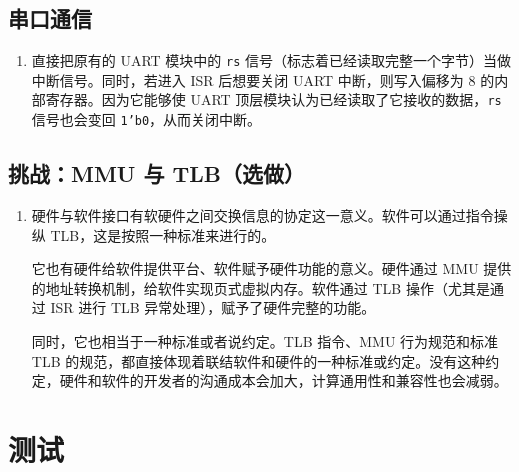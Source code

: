\documentclass[12pt,AutoFakeBold,AutoFakeSlant]{article}
\newcommand{\ms}[1]{\texttt{#1}}
\begin{document}
\subsection{串口通信}

\begin{enumerate}
\item
直接把原有的 UART 模块中的 \ms{rs} 信号（标志着已经读取完整一个字节）当做中断信号。同时，若进入 ISR 后想要关闭 UART 中断，则写入偏移为 8 的内部寄存器。因为它能够使 UART 顶层模块认为已经读取了它接收的数据，\ms{rs} 信号也会变回 \ms{1'b0}，从而关闭中断。
\end{enumerate}

\subsection{挑战：MMU 与 TLB（选做）}

\begin{enumerate}
\item
硬件与软件接口有软硬件之间交换信息的协定这一意义。软件可以通过指令操纵 TLB，这是按照一种标准来进行的。

它也有硬件给软件提供平台、软件赋予硬件功能的意义。硬件通过 MMU 提供的地址转换机制，给软件实现页式虚拟内存。软件通过 TLB 操作（尤其是通过 ISR 进行 TLB 异常处理），赋予了硬件完整的功能。

同时，它也相当于一种标准或者说约定。TLB 指令、MMU 行为规范和标准 TLB 的规范，都直接体现着联结软件和硬件的一种标准或约定。没有这种约定，硬件和软件的开发者的沟通成本会加大，计算通用性和兼容性也会减弱。
\end{enumerate}

\section{测试}
\end{document}
